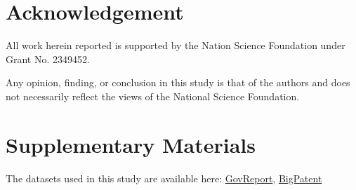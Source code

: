 \section*{Acknowledgement}

	All work herein reported is supported by the Nation Science Foundation under Grant
	No. 2349452.

	Any opinion, finding, or conclusion in this study is that of the authors and does not
	necessarily reflect the views of the National Science Foundation.

\section*{Supplementary Materials}

	The datasets used in this study are available here:
	\href{https://gov-report-data.github.io/}{GovReport},
	\href{https://evasharma.github.io/bigpatent/}{BigPatent}
